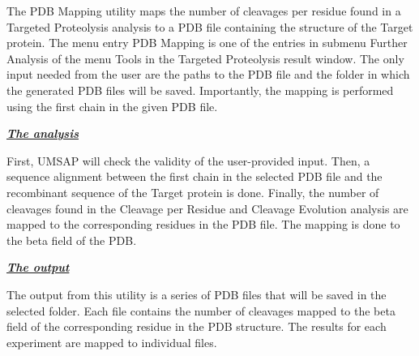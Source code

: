 The PDB Mapping utility maps the number of cleavages per residue found in a Targeted
Proteolysis analysis to a PDB file containing the structure of the Target protein.
The menu entry PDB Mapping is one of the entries in submenu Further Analysis of the
menu Tools in the Targeted Proteolysis result window. The only input needed from
the user are the paths to the PDB file and the folder in which the generated PDB
files will be saved. Importantly, the mapping is performed using the first chain
in the given PDB file.

\textit{\textbf{\underline{The analysis}}}

First, UMSAP will check the validity of the user-provided input. Then, a sequence
alignment between the first chain in the selected PDB file and the recombinant 
sequence of the Target protein is done. Finally, the number of cleavages found in
the Cleavage per Residue and Cleavage Evolution analysis are mapped to the
corresponding residues in the PDB file. The mapping is done to the beta field of
the PDB.

\textit{\textbf{\underline{The output}}}

The output from this utility is a series of PDB files that will be saved in the
selected folder. Each file contains the number of cleavages mapped to the beta field
of the corresponding residue in the PDB structure. The results for each experiment
are mapped to individual files.




